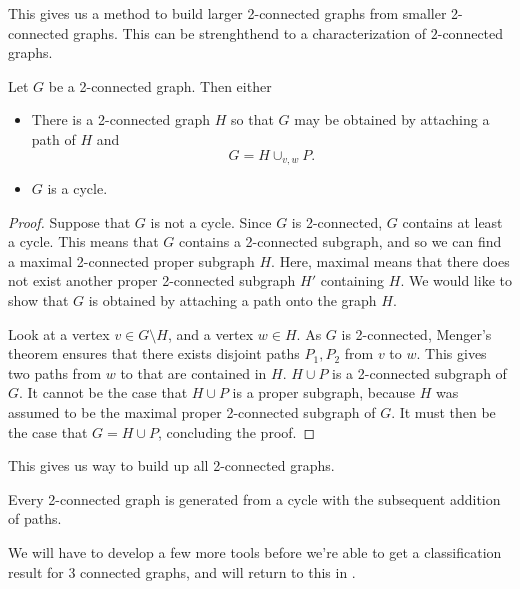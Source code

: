 
This gives us a method to build larger 2-connected graphs from smaller 2-connected graphs.
This can be strenghthend to a characterization of $2$-connected graphs. 
\begin{theorem}
	Let $G$ be a 2-connected graph. Then either 
		\begin{itemize}
			\item 
			There is a 2-connected graph $H$ so that $G$ may be obtained by attaching a path of $H$ and
			\[G=H\cup_{v,w} P.\]
			\item 
			$G$ is a cycle.
		\end{itemize} 
\end{theorem}
\begin{proof}
	Suppose that $G$ is not a cycle.
	Since $G$ is 2-connected, $G$ contains at least a cycle.
	This means that $G$ contains a 2-connected subgraph, and so we can find a maximal 2-connected proper subgraph $H$. 
	Here, maximal means that there does not exist another proper 2-connected subgraph $H'$ containing $H$. 
	We would like to show that $G$ is obtained by attaching a path onto the graph $H$. 


	Look at a vertex $v\in G\setminus H$, and a vertex $w\in H$.
	As $G$ is 2-connected,  Menger's theorem ensures that there exists disjoint paths $P_1, P_2$ from $v$ to $w$.
	This gives two paths from $w$ to that are contained in $H$.
	$H\cup P$ is a 2-connected subgraph of $G$.
	It cannot be the case that $H\cup P$ is a proper subgraph, because $H$ was assumed to be the maximal proper 2-connected subgraph of $G$.
	It must then be the case that $G=H\cup P$, concluding the proof. 
\end{proof}
This gives us way to build up all 2-connected graphs. 
\begin{corollary}
	Every 2-connected graph is generated from a cycle with the subsequent addition of paths.
\end{corollary}
We will have to develop a few more tools before we're able to get  a classification result for 3 connected graphs, and will return to this in .

